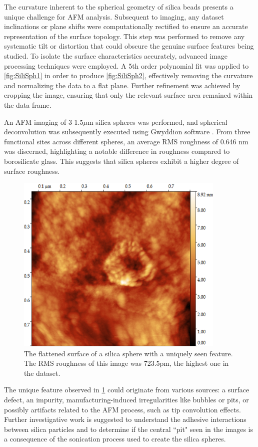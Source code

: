 The curvature inherent to the spherical geometry of silica beads presents a unique challenge for AFM analysis. Subsequent to imaging, any dataset inclinations or plane shifts were computationally rectified to ensure an accurate representation of the surface topology. This step was performed to remove any systematic tilt or distortion that could obscure the genuine surface features being studied. To isolate the surface characteristics accurately, advanced image processing techniques were employed. A 5th order polynomial fit was applied to \ref{fig:SiliSph1} in order to produce \ref{fig:SiliSph2}, effectively removing the curvature and normalizing the data to a flat plane. Further refinement was achieved by cropping the image, ensuring that only the relevant surface area remained within the data frame.

An AFM imaging of 3 1.5$\mu$m silica spheres was performed, and spherical deconvolution was subsequently executed using Gwyddion software \cite{gwy}. From three functional sites across different spheres, an average RMS roughness of 0.646 nm was discerned, highlighting a notable difference in roughness compared to borosilicate glass. This suggests that silica spheres exhibit a higher degree of surface roughness.

\begin{figure}[h!!!!!]     %
        \begin{center}
          \includegraphics[width=100mm]{chapter3/Sili2.png}
\end{center}
\caption{The flattened surface of a silica sphere with a uniquely seen feature. The RMS roughness of this image was 723.5pm, the highest one in the dataset.}
\label{fig:SiliSph3}                 %
\end{figure}

The unique feature observed in \ref{fig:SiliSph3} could originate from various sources: a surface defect, an impurity, manufacturing-induced irregularities like bubbles or pits, or possibly artifacts related to the AFM process, such as tip convolution effects. Further investigative work is suggested to understand the adhesive interactions between silica particles and to determine if the central ``pit" seen in the images is a consequence of the sonication process used to create the silica spheres. \cite{SilicaGrowth}

\newpage